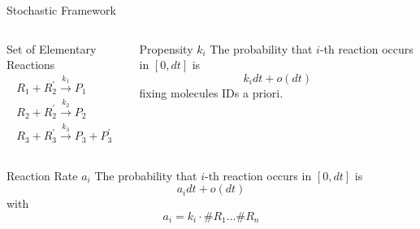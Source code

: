 \documentclass{beamer}
\begin{document}
\begin{frame}{Stochastic Framework}
  \begin{columns}
    \begin{column}{.45 \textwidth}
      \begin{block}{Set of Elementary Reactions}
        \begin{equation*}
          \begin{gathered}
            R_1 + R^\prime_2 \xrightarrow{k_1} P_1 \\
            R_2 + R^\prime_2 \xrightarrow{k_2} P_2 \\
            R_3 + R_3^\prime \xrightarrow{k_3} P_3 + P_3^\prime 
          \end{gathered}
        \end{equation*}
      \end{block}
    \end{column} 
    \begin{column}{.45 \textwidth}
      \begin{block}{Propensity $k_i$}
        The probability that $i$-th reaction occurs
        in  $[0, dt]$ is
        $$k_i dt + o(dt)$$
        fixing molecules IDs a priori.
      \end{block}
    \end{column}
  \end{columns}
  \pause
  \begin{block}{Reaction Rate $a_i$}
    The probability that $i$-th reaction occurs
    in  $[0, dt]$ is
    $$a_i dt + o(dt)$$
    with
    $$ a_i = k_i \cdot \# R_1 \dots \#R_n$$
  \end{block}
\end{frame}
\end{document}
